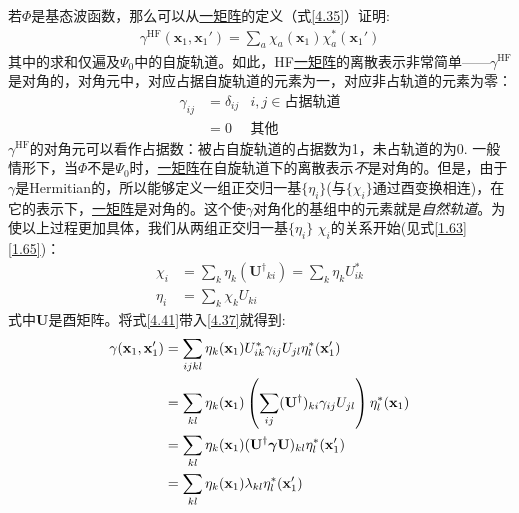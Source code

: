 若$\Phi$是\hft 基态波函数，那么可以从\underline{一矩阵}的定义（式\eqref{4.35}）证明:
\begin{align}
\gamma^\mathrm{HF}(\mathbf{x}_1,\mathbf{x}_1') = \sum_a \chi_a(\mathbf{x}_1)\chi_a^*(\mathbf{x}_1')
\end{align}
其中的求和仅遍及$\Psi_0$中的自旋轨道。如此，HF\underline{一矩阵}的离散表示非常简单——$\gamma^\mathrm{HF}$是对角的，对角元中，对应占据自旋轨道的元素为一，对应非占轨道的元素为零：
\begin{equation}
\begin{aligned}
\gamma_{ij} & =\delta_{ij}&i,j\in\text{占据轨道}\\
            & = 0 &其他\label{4.40} 
\end{aligned}
\end{equation}
$\gamma^\mathrm{HF}$的对角元可以看作占据数：被占自旋轨道的占据数为1，未占轨道的为0.
一般情形下，当$\Phi$不是$\Psi_0$时，\underline{一矩阵}在\hft 自旋轨道下的离散表示\emph{不}是对角的。但是，由于$\gamma$是Hermitian的，所以能够定义一组正交归一基$\{\eta_i\}$(与$\{\chi_i\}$通过酉变换相连)，在它的表示下，\underline{一矩阵}是对角的。这个使$\gamma$对角化的基组中的元素就是\emph{自然轨道}。为使以上过程更加具体，我们从两组正交归一基$\{\eta_i\}$ $\chi_i$的关系开始(见式\eqref{1.63}\eqref{1.65})：
\begin{align}
\chi_i & = \sum_k \eta_k (\mathbf{U^\dagger}_{ki}) = \sum_k \eta_k U^*_{ik}\\
\eta_i & = \sum_k\chi_k U_{ki} \label{4.41}
\end{align}
式中$\mathbf{U}$是酉矩阵。将式\eqref{4.41}带入\eqref{4.37}就得到:
\begin{align}
\gamma(\mathbf{x}_1,\mathbf{x}_1') & = \sum_{ijkl} \eta_k(\mathbf{x}_1) U^*_{ik} \gamma_{ij} U_{jl} \eta_l^*(\mathbf{x}_1')\notag\\
                                   & = \sum_{kl} \eta_k(\mathbf{x}_1) \left( \sum_{ij} (\mathbf{U}^\dagger)_{ki} \gamma_{ij} U_{jl}  \right) \eta_l^*(\mathbf{x}_1)\notag\\
                                   & = \sum_{kl} \eta_k(\mathbf{x}_1) (\mathbf{U}^\dagger \bm{\gamma}\mathbf{U})_{kl} \eta_l^*(\mathbf{x}_1')\notag\\
                                   & = \sum_{kl} \eta_k(\mathbf{x}_1) \lambda_{kl} \eta_l^*(\mathbf{x}_1')
\end{align}
